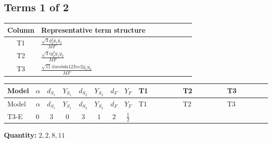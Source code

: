 \documentclass[8pt]{article}
\begin{document}
\begin{landscape}
\subsection*{Terms 1 of 2}
\begin{center}
\begin{tabular}{@{}c >{\raggedright\arraybackslash}p{0.82\linewidth}@{}}
\toprule
Column & Representative term structure \\
\midrule
T1 & \(\displaystyle \frac{\sqrt{3} g_{2}^{2} \overline{y_{1}} \overline{y_{2}}}{MF}\) \\
\midrule
T2 & \(\displaystyle \frac{\sqrt{3} i g_{2}^{2} \overline{y_{1}} \overline{y_{2}}}{MF}\) \\
\midrule
T3 & \(\displaystyle \frac{\sqrt{11} i lambda12Inv2 \overline{y_{1}} \overline{y_{2}}}{MF}\) \\
\midrule
\bottomrule
\end{tabular}
\end{center}
\smallskip
\tiny
\begin{longtable}{@{}llcccccc >{\raggedright\arraybackslash}p{0.21\linewidth} >{\raggedright\arraybackslash}p{0.21\linewidth} >{\raggedright\arraybackslash}p{0.21\linewidth}@{}}
\toprule
Model & $\alpha$ & $d_{S_1}$ & $Y_{S_1}$ & $d_{S_2}$ & $Y_{S_2}$ & $d_F$ & $Y_F$ & T1 & T2 & T3 \\
\midrule
\endfirsthead
\toprule
Model & $\alpha$ & $d_{S_1}$ & $Y_{S_1}$ & $d_{S_2}$ & $Y_{S_2}$ & $d_F$ & $Y_F$ & T1 & T2 & T3 \\
\midrule
\endhead
T3-E & $0$ & $3$ & $0$ & $3$ & $1$ & $2$ & $\frac{1}{2}$ & \scriptsize\adjustbox{max width=\linewidth}{$\begin{gathered} - \frac{\sqrt{3} g_{2}^{2} \overline{y_{1}} \overline{y_{2}}}{6 MF}\end{gathered}$} & \scriptsize\adjustbox{max width=\linewidth}{$\begin{gathered} - \frac{11 \sqrt{3} i g_{2}^{2} \overline{y_{1}} \overline{y_{2}}}{8 MF}\end{gathered}$} & \scriptsize\adjustbox{max width=\linewidth}{$\begin{gathered} - \frac{3 \sqrt{11} i lambda12Inv2 \overline{y_{1}} \overline{y_{2}}}{22 MF}\end{gathered}$} \\
\midrule
\bottomrule
\end{longtable}
\clearpage
\noindent\textbf{Quantity: }$\mathrm{2,2,8,11}$\par\smallskip

\end{landscape}
\end{document}

